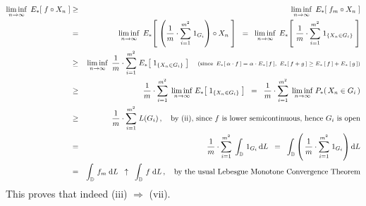 \begin{eqnarray*}
\underset{n\rightarrow\infty}{\liminf}\;\,E_{*}\!\left[\;f \circ X_{n}\;\right]
&\geq&
	\underset{n\rightarrow\infty}{\liminf}\;\,E_{*}\!\left[\;f_{m} \circ X_{n}\;\right]
\\
&=&
	\underset{n\rightarrow\infty}{\liminf}\;\,
	E_{*}\!\left[\;
		\left(\dfrac{1}{m} \cdot \overset{m^{2}}{\underset{i=1}{\sum}} \; 1_{G_{i}}\right) \circ X_{n}
		\;\right]
\;\; = \;\;
	\underset{n\rightarrow\infty}{\liminf}\;\,
	E_{*}\!\left[\;
		\dfrac{1}{m} \cdot \overset{m^{2}}{\underset{i=1}{\sum}} \; 1_{\{X_{n} \in G_{i}\}}
		\;\right]
\\
&\geq&
	\underset{n\rightarrow\infty}{\liminf}\;\,
	\dfrac{1}{m} \cdot \overset{m^{2}}{\underset{i=1}{\sum}} \; E_{*}\!\left[\; 1_{\{X_{n} \in G_{i}\}} \;\right]
	\quad
	\textnormal{\scriptsize(since \,$E_{*}\!\left[\,\alpha\cdot f\,\right] = \alpha\cdot E_{*}\!\left[\,f\,\right]$,
	\,$E_{*}\!\left[\,f + g\,\right] \geq E_{*}\left[\,f\,\right] + E_{*}\left[\,g\,\right]$)}
\\
&\geq&
	\dfrac{1}{m} \cdot \overset{m^{2}}{\underset{i=1}{\sum}}\;\,
	\underset{n\rightarrow\infty}{\liminf}\;
	E_{*}\!\left[\; 1_{\{X_{n} \in G_{i}\}} \;\right]
\;\; = \;\;
	\dfrac{1}{m} \cdot \overset{m^{2}}{\underset{i=1}{\sum}}\;\,
	\underset{n\rightarrow\infty}{\liminf}\;
	P_{*}\!\left(\, X_{n} \in G_{i} \,\right)
\\
&\geq&
	\dfrac{1}{m} \cdot \overset{m^{2}}{\underset{i=1}{\sum}}\; L(G_{i})\,,
	\quad
	\textnormal{by (ii), since $f$ is lower semicontinuous, hence $G_{i}$ is open}
\\
&=&
	\dfrac{1}{m} \cdot \overset{m^{2}}{\underset{i=1}{\sum}}\; \int_{\D}\, 1_{G_{i}} \,\d L
\;\; = \;\;
	\int_{\D} \left(\,\dfrac{1}{m} \cdot \overset{m^{2}}{\underset{i=1}{\sum}}\; 1_{G_{i}} \right) \d L
\\
&=&
	\int_{\D}\, f_{m} \;\d L
	\;\; \uparrow \;\;
	\int_{\D}\, f \;\d L\,,
	\quad
	\textnormal{by the usual Lebesgue Monotone Convergence Theorem}
\end{eqnarray*}
This proves that indeed (iii) $\Longrightarrow$ (vii).

